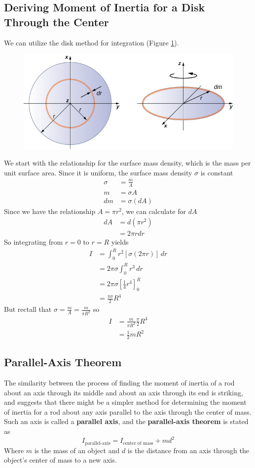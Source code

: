 \subsection{Deriving Moment of Inertia for a Disk Through the Center}
We can utilize the disk method for integration (Figure \ref{fig:disk-moment-of-inertia}).
\begin{figure}[ht!]
    \centering
    \includegraphics[width=0.8 \textwidth]{../figures/disk moment of inertia.jpg}
    \caption{}
    \label{fig:disk-moment-of-inertia}
\end{figure}
We start with the relationship for the surface mass density, which is the mass per unit surface
area. Since it is uniform, the surface mass density $\sigma$ is constant
\begin{align*}
    \sigma&=\frac{m}{A}\\
    m&=\sigma A\\
   dm&=\sigma(dA)
\end{align*}
Since we have the relationship $A=\pi r^2$, we can calculate for $dA$
\begin{align*}
    dA&=d(\pi r^2)\\
    &=2\pi rdr
\end{align*}
So integrating from $r=0$ to $r=R$ yields
\begin{align*}
    I&=\int_0^Rr^2[\sigma(2\pi r)]\,dr\\
    &=2\pi\sigma\int_0^R r^3\,dr\\
    &=2\pi\sigma \left[\frac{1}{4}r^4\right]_0^R\\
    &=\frac{\pi\sigma}{2}R^4
\end{align*}
But rectall that $\sigma=\frac{m}{A}=\frac{m}{\pi R^2}$ so
\begin{align*}
    I&=\frac{m}{\pi R^2}\frac{\pi}{2}R^4\\
    &=\frac{1}{2}mR^2
\end{align*}

\subsection{Parallel-Axis Theorem}
The similarity between the process of finding the moment of inertia of a rod about an axis through
its middle and about an axis through its end is striking, and suggests that there might be a simpler
method for determining the moment of inertia for a rod about any axis parallel to the axis through
the center of mass. Such an axis is called a \textbf{parallel axis}, and the \textbf{parallel-axis
theorem} is stated as
\[
    I_\text{parallel-axis}=I_\text{center of mass}+md^2
\]
Where $m$ is the mass of an object and $d$ is the distance from an axis through the object's 
center of mass to a new axis.

